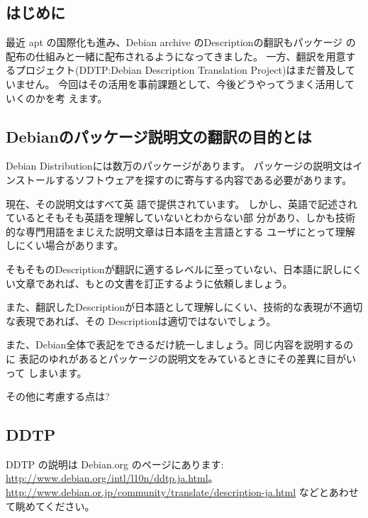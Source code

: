 \documentclass[mingoth,a4paper]{jsarticle}
\begin{document}
\begin{commandline}

\subsection{はじめに}

最近 apt の国際化も進み、Debian archive のDescriptionの翻訳もパッケージ
の配布の仕組みと一緒に配布されるようになってきました。
一方、翻訳を用意するプロジェクト(DDTP:Debian Description Translation
Project)はまだ普及していません。
今回はその活用を事前課題として、今後どうやってうまく活用していくのかを考
えます。

\subsection{Debianのパッケージ説明文の翻訳の目的とは}

Debian Distributionには数万のパッケージがあります。
パッケージの説明文はインストールするソフトウェアを探すのに寄与する内容である必要があります。

現在、その説明文はすべて英
語で提供されています。
しかし、英語で記述されているとそもそも英語を理解していないとわからない部
分があり、しかも技術的な専門用語をまじえた説明文章は日本語を主言語とする
ユーザにとって理解しにくい場合があります。

そもそものDescriptionが翻訳に適するレベルに至っていない、日本語に訳しにく
い文章であれば、もとの文書を訂正するように依頼しましょう。

また、翻訳したDescriptionが日本語として理解しにくい、技術的な表現が不適切な表現であれば、その
Descriptionは適切ではないでしょう。

また、Debian全体で表記をできるだけ統一しましょう。同じ内容を説明するのに
表記のゆれがあるとパッケージの説明文をみているときにその差異に目がいって
しまいます。

その他に考慮する点は?

\subsection{DDTP}

DDTP の説明は Debian.org のページにあります: 
\url{http://www.debian.org/intl/l10n/ddtp.ja.html}。
\url{http://www.debian.or.jp/community/translate/description-ja.html}
などとあわせて眺めてください。


\end{commandline}
\end{document}
